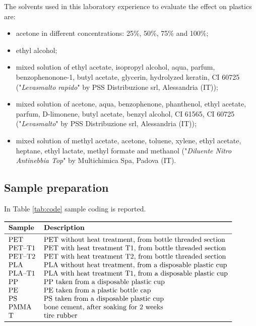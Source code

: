\documentclass[a4paper, 11pt]{article}
\begin{document}
The solvents used in this laboratory experience to evaluate the effect on plastics are:
\begin{itemize}
    \item acetone in different concentrations: 25\%, 50\%, 75\% and 100\%;
    \item ethyl alcohol;
    \item mixed solution of ethyl acetate, isopropyl alcohol, aqua, parfum, benzophenonone-1, butyl acetate, glycerin, hydrolyzed keratin, CI 60725 ("\emph{Levasmalto rapido}" by PSS Distribuzione srl, Alessandria (IT));
        \item mixed solution of acetone, aqua, benzophenone, phanthenol, ethyl acetate, parfum, D-limonene, butyl acetate, benzyl alcohol, CI 61565, CI 60725 ("\emph{Levasmalto}" by PSS Distribuzione srl, Alessandria (IT));
    \item mixed solution of methyl acetate, acetone, toluene, xylene, ethyl acetate, heptane, ethyl lactate, methyl formate and methanol ("\textit{Diluente Nitro Antinebbia Top}" by Multichimica Spa, Padova (IT).
\end{itemize}

\newpage

\subsection{Sample preparation}

In Table \ref{tab:code} sample coding is reported. 
\begin{table}[htp]
\centering
$
\begin{tabular}{ll}
\toprule
\textbf{Sample} & \textbf{Description} \\
\midrule
PET & PET without heat treatment, from bottle threaded section \\
PET–T1 & PET with heat treatment T1, from bottle threaded section \\
PET–T2 & PET with heat treatment T2, from bottle threaded section \\
PLA & PLA without heat treatment, from a disposable plastic cup \\
PLA–T1 & PLA with heat treatment T1, from a disposable plastic cup \\
PP & PP taken from a disposable plastic cup \\
PE & PE taken from a plastic bottle cap \\
PS & PS taken from a disposable plastic cup \\
PMMA & bone cement, after soaking for 2 weeks \\
T & tire rubber \\
\bottomrule
\end{tabular}
$
\caption{Sample coding.}
\label{tab:code}
\end{table}\\
\end{document}

